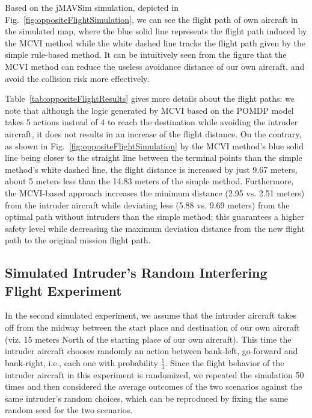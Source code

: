 \documentclass{article}
\newcommand{\jMAVSim}{\textsf{jMAVSim}}
\begin{document}
Based on the \jMAVSim{} simulation, depicted in Fig.~\ref{fig:oppositeFlightSimulation}, we can see the flight path of own aircraft in the simulated map, where the blue solid line represents the flight path induced by the MCVI method while the white dashed line tracks the flight path given by the simple rule-based method. 
It can be intuitively seen from the figure that the MCVI method can reduce the useless avoidance distance of our own aircraft, and avoid the collision risk more effectively.

Table~\ref{tab:oppositeFlightResults} gives more details about the flight paths: 
we note that although the logic generated by MCVI based on the POMDP model takes 5 actions instead of 4 to reach the destination while avoiding the intruder aircraft, it does not results in an increase of the flight distance.
On the contrary, as shown in Fig.~\ref{fig:oppositeFlightSimulation} by the MCVI method's blue solid line being closer to the straight line between the terminal points than the simple method's white dashed line, the flight distance is increased by just 9.67 meters, about 5 meters less than the 14.83 meters of the simple method.
Furthermore, the MCVI-based approach increases the minimum distance (2.95 vs. 2.51 meters) from the intruder aircraft while deviating less (5.88 vs. 9.69 meters) from the optimal path without intruders than the simple method; 
this guarantees a higher safety level while decreasing the maximum deviation distance from the new flight path to the original mission flight path. 


\subsection{Simulated Intruder's Random Interfering Flight Experiment}
\label{ssec:randomInterferingFlight}

In the second simulated experiment, we assume that the intruder aircraft takes off from the midway between the start place and destination of our own aircraft (viz. 15 meters North of the starting place of our own aircraft). 
This time the intruder aircraft chooses randomly an action between bank-left, go-forward and bank-right, i.e., each one with probability $\frac{1}{3}$. 
Since the flight behavior of the intruder aircraft in this experiment is randomized, we repeated the simulation 50 times and then considered the average outcomes of the two scenarios against the same intruder's random choices, which can be reproduced by fixing the same random seed for the two scenarios. 
\end{document}

